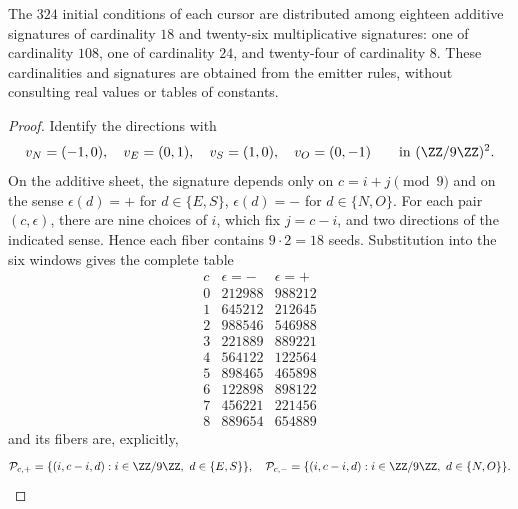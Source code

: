 \begin{lemma}
\label{lem:censo-interno-firmas}
The \(324\) initial conditions of each cursor are distributed among eighteen
additive signatures of cardinality \(18\) and twenty-six multiplicative signatures: one
of cardinality \(108\), one of cardinality \(24\), and twenty-four of cardinality \(8\).
These cardinalities and signatures are obtained from the emitter rules, without
consulting real values or tables of constants.
\end{lemma}
\begin{proof}
Identify the directions with
\[
 v_N=(-1,0),\quad v_E=(0,1),\quad
 v_S=(1,0),\quad v_O=(0,-1)
 \qquad\text{in }(\ZZ/9\ZZ)^2.
\]
On the additive sheet, the signature depends only on
\(c=i+j\pmod9\) and on the sense
\(\epsilon(d)=+\) for \(d\in\{E,S\}\),
\(\epsilon(d)=-\) for \(d\in\{N,O\}\). For each pair
\((c,\epsilon)\), there are nine choices of \(i\), which fix \(j=c-i\), and
two directions of the indicated sense. Hence each fiber contains
\(9\cdot2=18\) seeds. Substitution into the six windows gives the complete
table
\[
\begin{array}{c|cc}
c&\epsilon=-&\epsilon=+\\ \hline
0&212988&988212\\
1&645212&212645\\
2&988546&546988\\
3&221889&889221\\
4&564122&122564\\
5&898465&465898\\
6&122898&898122\\
7&456221&221456\\
8&889654&654889
\end{array}
\tag{A}
\label{eq:tabla-firmas-aditivas}
\]
and its fibers are, explicitly,
\[
 \mathcal P_{c,+}=\{(i,c-i,d):i\in\ZZ/9\ZZ,\ d\in\{E,S\}\},
 \quad
 \mathcal P_{c,-}=\{(i,c-i,d):i\in\ZZ/9\ZZ,\ d\in\{N,O\}\}.
\]


\end{proof}
